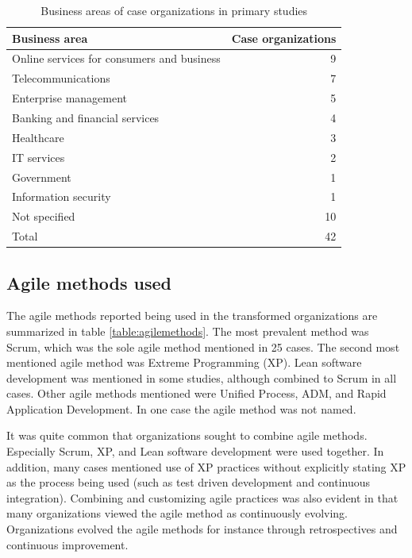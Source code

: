 \documentclass[preprint,authoryear,12pt]{elsarticle}
\begin{document}
\begin{table}[!t]
    \begin{tabular}{ l r }
        \toprule
        Business area    &  Case organizations   \\
        \midrule
		Online services for consumers and business  &  9  \\
		Telecommunications                          &  7  \\
		Enterprise management                       &  5  \\
		Banking and financial services              &  4  \\
		Healthcare                                  &  3  \\
		IT services                                 &  2  \\
		Government                                  &  1  \\
		Information security                        &  1  \\
		Not specified                               & 10  \\
        \midrule
		Total                                       & 42  \\
        \bottomrule
    \end{tabular}
    \caption{Business areas of case organizations in primary studies}
    \label{table:businessareas}
\end{table}


\subsection{Agile methods used}

The agile methods reported being used in the transformed organizations are
summarized in table \ref{table:agilemethods}. The most prevalent method was
Scrum, which was the sole agile method mentioned in 25 cases. The second most
mentioned agile method was Extreme Programming (XP). Lean software development
was mentioned in some studies, although combined to Scrum in all cases. Other
agile methods mentioned were Unified Process, ADM, and Rapid Application
Development. In one case the agile method was not named.

It was quite common that organizations sought to combine agile methods.
Especially Scrum, XP, and Lean software development were used together. In
addition, many cases mentioned use of XP practices without explicitly stating XP
as the process being used (such as test driven development and continuous
integration). Combining and customizing agile practices was also evident in that
many organizations viewed the agile method as continuously evolving.
Organizations evolved the agile methods for instance through retrospectives and
continuous improvement.
\end{document}
